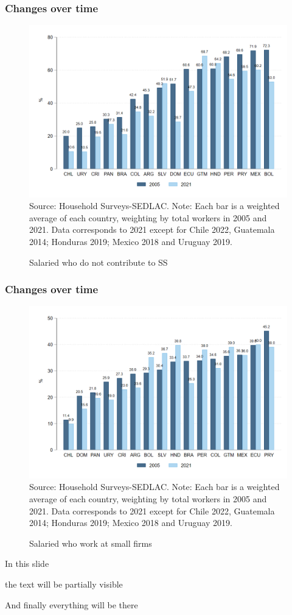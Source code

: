 \documentclass{beamer}
\begin{document}
\begin{frame}
\frametitle{Changes over time}
\begin{figure}[!htb]
    \justifying
     \caption{Salaried who do not contribute to SS}     
       \includegraphics[width=0.5\linewidth]
       {latex/figures/Snapshot/snapshot_informal_ss_dep.png}
    \label{fig:SalariedSS}
    \footnotesize{Source: Household Surveys-SEDLAC.}
    \footnotesize{Note: Each bar is a weighted average of each country, weighting by total workers in 2005 and 2021.  Data corresponds to 2021 except for Chile 2022, Guatemala 2014; Honduras 2019; Mexico 2018 and Uruguay 2019.}
\end{figure}


    
\end{frame}


\begin{frame}
\frametitle{Changes over time}
\begin{figure}[!htb]
    \justifying
     \caption{Salaried who work at small firms}     
     \includegraphics[width=0.5\linewidth]{latex/figures/Snapshot/snapshot_dependents_small.png}
    \label{fig:SalariedSmall}
    \footnotesize{Source: Household Surveys-SEDLAC.}
    \footnotesize{Note: Each bar is a weighted average of each country, weighting by total workers in 2005 and 2021.  Data corresponds to 2021 except for Chile 2022, Guatemala 2014; Honduras 2019; Mexico 2018 and Uruguay 2019.}
\end{figure}
\end{frame}
\begin{frame}
In this slide \pause

the text will be partially visible \pause

And finally everything will be there
\end{frame}
\end{document}
